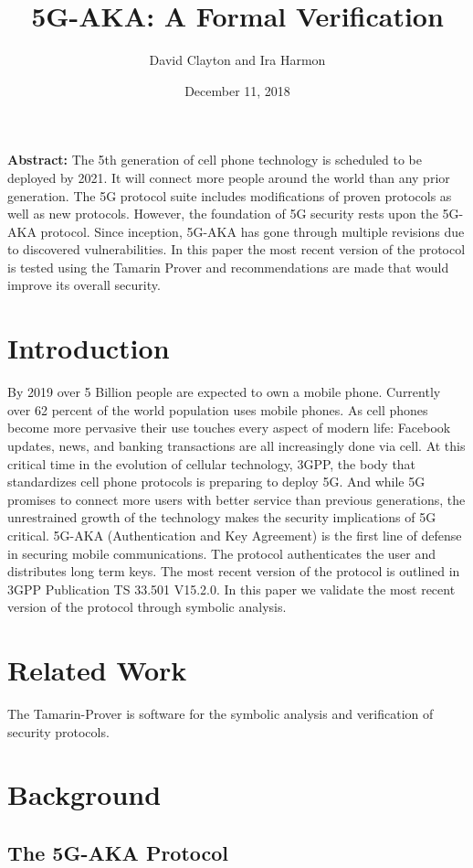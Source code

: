\documentclass[10pt, pdftex]{article}
\title{5G-AKA: A Formal Verification}
\author{David Clayton and Ira Harmon}
\date{December 11, 2018}
\begin{document}
\maketitle
\textbf{Abstract:} 
The 5th generation of cell phone technology is scheduled to be deployed by 2021.  It will connect more people around the world than any prior generation.  The 5G protocol suite includes modifications of proven protocols as well as new protocols.  However, the foundation of 5G security rests upon the 5G-AKA protocol.  Since inception, 5G-AKA has gone through multiple revisions due to discovered vulnerabilities.  In this paper the most recent version of the protocol is tested using the Tamarin Prover and recommendations are made that would improve its overall security.

\newpage
\section{Introduction}
By 2019 over 5 Billion people are expected to own a mobile phone.  Currently over 62 percent of the world population uses mobile phones.  As cell phones become more pervasive their use touches every aspect of modern life: Facebook updates, news, and banking transactions are all increasingly done via cell.  At this critical time in the evolution of cellular technology, 3GPP, the body that standardizes cell phone protocols is preparing to deploy 5G.  And while 5G promises to connect more users with better service than previous generations, the unrestrained growth of the technology makes the security implications of 5G critical.  5G-AKA (Authentication and Key Agreement) is the first line of defense in securing mobile communications.  The protocol authenticates the user and distributes long term keys.  The most recent version of the protocol is outlined in 3GPP Publication TS 33.501 V15.2.0.  In this paper we validate the most recent version of the protocol through symbolic analysis.  

\section{Related Work}
The Tamarin-Prover is software for the symbolic analysis and verification of security protocols.


\section{Background}
\subsection{The 5G-AKA Protocol}
\end{document}
